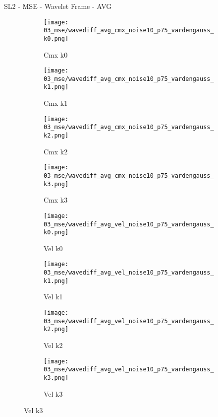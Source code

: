 \documentclass{beamer}
\begin{document}
\begin{frame}{SL2 - MSE - Wavelet Frame - AVG}{}
\begin{figure}
\begin{subfigure}{0.24\textwidth}
\texttt{[image: 03\_mse/wavediff\_avg\_cmx\_noise10\_p75\_vardengauss\_k0.png]}
\vspace{-20pt}
\caption*{\tiny Cmx k0}
\end{subfigure}
\begin{subfigure}{0.24\textwidth}
\texttt{[image: 03\_mse/wavediff\_avg\_cmx\_noise10\_p75\_vardengauss\_k1.png]}
\vspace{-20pt}
\caption*{\tiny Cmx k1}
\end{subfigure}
\begin{subfigure}{0.24\textwidth}
\texttt{[image: 03\_mse/wavediff\_avg\_cmx\_noise10\_p75\_vardengauss\_k2.png]}
\vspace{-20pt}
\caption*{\tiny Cmx k2}
\end{subfigure}
\begin{subfigure}{0.24\textwidth}
\texttt{[image: 03\_mse/wavediff\_avg\_cmx\_noise10\_p75\_vardengauss\_k3.png]}
\vspace{-20pt}
\caption*{\tiny Cmx k3}
\end{subfigure}

\begin{subfigure}{0.24\textwidth}
\texttt{[image: 03\_mse/wavediff\_avg\_vel\_noise10\_p75\_vardengauss\_k0.png]}
\vspace{-20pt}
\caption*{\tiny Vel k0}
\end{subfigure}
\begin{subfigure}{0.24\textwidth}
\texttt{[image: 03\_mse/wavediff\_avg\_vel\_noise10\_p75\_vardengauss\_k1.png]}
\vspace{-20pt}
\caption*{\tiny Vel k1}
\end{subfigure}
\begin{subfigure}{0.24\textwidth}
\texttt{[image: 03\_mse/wavediff\_avg\_vel\_noise10\_p75\_vardengauss\_k2.png]}
\vspace{-20pt}
\caption*{\tiny Vel k2}
\end{subfigure}
\begin{subfigure}{0.24\textwidth}
\texttt{[image: 03\_mse/wavediff\_avg\_vel\_noise10\_p75\_vardengauss\_k3.png]}
\vspace{-20pt}
\caption*{\tiny Vel k3}
\end{subfigure}
\end{figure}
\end{frame}
\end{document}
